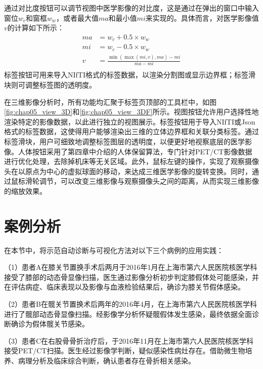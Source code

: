 通过对比度按钮可以调节视图中医学影像的对比度，这是通过在弹出的窗口中输入窗位\(w_c\)和窗框\(w_w\)，或者最大值\(ma\)和最小值\(mi\)来实现的。具体而言，对医学影像值\(v\)的计算如下所示：
\begin{equation}
  \begin{aligned}
    ma & = w_c + 0.5 \times w_w                       \\
    mi & = w_c - 0.5 \times w_w                       \\
    v  & = \frac{\min(\max(mi, v), ma) - mi}{ma - mi} \\
  \end{aligned}
  \label{eq:chap05_constrast}
\end{equation}
标签按钮可用来导入NIfTI格式的标签数据，以渲染分割图或显示边界框；标签滑块则可调整标签图的透明度。

在三维影像分析时，所有功能均汇聚于标签页顶部的工具栏中，如图\ref{fig:chap05_view_3D}和\ref{fig:chap05_view_3DF}所示。视图按钮允许用户选择性地渲染特定的影像数据，以此进行独立的视图展示。标签按钮用于导入NIfTI或Json格式的标签数据，这使得用户能够渲染出三维的立体边界框和关联分类标签。通过标签滑块，用户可细致地调整标签图层的透明度，以便更好地视察底层的医学影像。人体按钮采用了第四章中介绍的人体保留算法，专门针对PET/CT影像数据进行优化处理，去除掉机床等无关区域。此外，鼠标左键的操作，实现了观察摄像头在以原点为中心的虚拟球面的移动，来达成三维医学影像的旋转变换。同时，通过鼠标滑轮调节，可以改变三维影像与观察摄像头之间的距离，从而实现三维影像的缩放效果。

\section{案例分析}

在本节中，将示范自动诊断与可视化方法对以下三个病例的应用实践：

（1）患者A在膝关节置换手术后两月于2016年1月在上海市第六人民医院核医学科接受了膝部的动态骨显像扫描，医生通过影像分析初步判定膝假体处可能感染，并在评估病症、临床表现以及影像与血液检验结果后，确诊为膝关节假体感染。

（2）患者B在髋关节置换术后两年的2016年4月，在上海市第六人民医院核医学科进行了髋部动态骨显像扫描。经影像学分析怀疑髋假体发生感染，最终依据全面诊断确诊为假体髋关节感染。

（3）患者C在右股骨骨折治疗后，于2016年11月在上海市第六人民医院核医学科接受PET/CT扫描。医生经过影像学判断，疑似感染性病灶存在。借助微生物培养、病理分析及临床综合判断，确认患者存在骨折相关感染。

